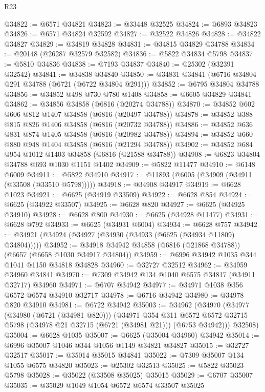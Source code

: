 \begin{lexlean}{R23}
\begin{coremodule}
@34822 := @6571 @34821
@34823 := @33448 @32525
@34824 := @6893 @34823
@34826 := @6571 @34824 @32592
@34827 := @32522 @34826
@34828 := @34822 @34827
@34829 := @34819 @34828
@34831 := @34815 @34829 @34788
@34834 := @20148 (@26287 @32579 @32582)
@34836 := @5822 @34834 @5798
@34837 := @5810 @34836
@34838 := @7193 @34837
@34840 := @25302 (@32391 @32542)
@34841 := @34838 @34840
@34850 := @34831 @34841 (@6716 @34804 @291 @34788 (@6721 (@6722 @34804 @291)))
@34852 := @6795 @34804 @34788
@34856 := @34852 @498 @730 @780 @1408
@34858 := @6605 @34829 @34841
@34862 := @34856 @34858 (@6816 (@20274 @34788))
@34870 := @34852 @602 @606 @812 @1407 @34858 (@6816 (@20497 @34788))
@34878 := @34852 @388 @815 @826 @1406 @34858 (@6816 (@20732 @34788))
@34886 := @34852 @636 @831 @874 @1405 @34858 (@6816 (@20982 @34788))
@34894 := @34852 @660 @880 @948 @1404 @34858 (@6816 (@21294 @34788))
@34902 := @34852 @684 @954 @1012 @1403 @34858 (@6816 (@21588 @34788))
@34908 := @6823 @34804 @34788 @693 @1030 @1151 @1402
@34909 := @5822 @11477
@34910 := @6148 @6009
@34911 := @5822 @34910
@34917 := @11893 (@6005 (@34909 (@34911 (@33508 (@33510 @5798)))))
@34918 := @34908 @34917
@34919 := @6628 @1023
@34921 := @6625 (@34919 @33509)
@34922 := @6628 @854
@34924 := @6625 (@34922 @33507)
@34925 := @6628 @820
@34927 := @6625 (@34925 @34910)
@34928 := @6628 @800
@34930 := @6625 (@34928 @11477)
@34931 := @6628 @792
@34933 := @6625 (@34931 @6004)
@34934 := @6628 @757
@34942 := @34921 (@34924 (@34927 (@34930 (@34933 (@6625 (@34934 @11809) @34804)))))
@34952 := @34918 @34942 @34858 (@6816 (@21868 @34788)) (@6657 (@6658 @1030 @34917 @34804))
@34959 := @6996 @34942 @1035 @344 @1041 @1150 @34818 @34828
@34960 := @32727 @32512
@34962 := @34959 @34960 @34841
@34970 := @7309 @34942 @134 @1040 @6575 @34817 (@34911 @32717) @34960
@34971 := @6707 @34942
@34977 := @34971 @1038 @356 @6572 @6574 @34910 @32717
@34978 := @6716 @34942
@34980 := @34978 @820 @34910
@34981 := @6722 @34942
@35003 := @34962
    (@34970
      (@34977
        (@34980 (@6721 (@34981 @820)))
        (@34971
          @354
          @311
          @6572
          @6572
          @32715
          @5798
          (@34978 @21 @32715 (@6721 (@34981 @21)))
          (@6753 @34942)))
      @32508)
@35004 := @6628 @1035
@35007 := @6625 (@35004 @34960) @34942
@35014 := @6996 @35007 @1046 @344 @1056 @1149 @34821 @34827
@35015 := @32727 @32517
@35017 := @35014 @35015 @34841
@35022 := @7309 @35007 @134 @1055 @6575 @34820
@35023 := @25302 @32513
@35025 := @5822 @35023 @5798
@35028 := @35022 (@33508 @35025) @35015
@35029 := @6707 @35007
@35035 := @35029 @1049 @1054 @6572 @6574 @33507 @35025

\end{coremodule}
\end{lexlean}
